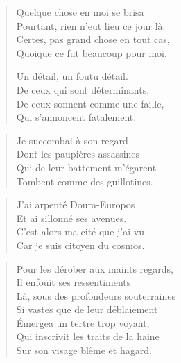 \begin{verse}%
  \quatrain%
  Quelque chose en moi se brisa\\  %
  Pourtant, rien n’eut lieu ce jour là.\\  %
  Certes, pas grand chose en tout cas,\\  %
  Quoique ce fut beaucoup pour moi.

  Un détail, un foutu détail.\\  %
  De ceux qui sont déterminants,\\  %
  De ceux sonnent comme une faille,\\  %
  Qui s’annoncent fatalement.
\end{verse}

\begin{verse}%
  \quatrain%
  Je succombai à son regard\\
  Dont les paupières assassines\\
  Qui de leur battement m’égarent\\
  Tombent comme des guillotines.
\end{verse}

\begin{verse}%
  \quatrain%
  J’ai arpenté Doura-Europos\\  %
  Et ai sillonné ses avenues.\\  %
  C’est alors ma cité que j’ai vu\\  %
  Car je suis citoyen du cosmos.
\end{verse}

\begin{verse}%
  \quatrain%
  Pour les dérober aux maints regards,\\  %
  Il enfouit ses ressentiments\\  %
  Là, sous des profondeurs souterraines\\  %
  Si vastes que de leur déblaiement\\  %
  Émergea un tertre trop voyant,\\  %
  Qui inscrivit les traits de la haine\\  %
  Sur son visage blême et hagard.
\end{verse}



